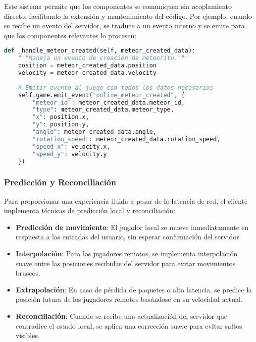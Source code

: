 \documentclass[12pt,letterpaper]{article}
\begin{document}
Este sistema permite que los componentes se comuniquen sin acoplamiento directo, facilitando la extensión y mantenimiento del código. Por ejemplo, cuando se recibe un evento del servidor, se traduce a un evento interno y se emite para que los componentes relevantes lo procesen:

\begin{lstlisting}[language=python, caption=Ejemplo de traducción de eventos de red a eventos del juego]
def _handle_meteor_created(self, meteor_created_data):
    """Maneja un evento de creación de meteorito."""
    position = meteor_created_data.position
    velocity = meteor_created_data.velocity
    
    # Emitir evento al juego con todos los datos necesarios
    self.game.emit_event("online_meteor_created", {
        "meteor_id": meteor_created_data.meteor_id,
        "type": meteor_created_data.meteor_type,
        "x": position.x,
        "y": position.y,
        "angle": meteor_created_data.angle,
        "rotation_speed": meteor_created_data.rotation_speed,
        "speed_x": velocity.x,
        "speed_y": velocity.y
    })
\end{lstlisting}

\subsubsection{Predicción y Reconciliación}

Para proporcionar una experiencia fluida a pesar de la latencia de red, el cliente implementa técnicas de predicción local y reconciliación:

\begin{itemize}
    \item \textbf{Predicción de movimiento}: El jugador local se mueve inmediatamente en respuesta a las entradas del usuario, sin esperar confirmación del servidor.
    
    \item \textbf{Interpolación}: Para los jugadores remotos, se implementa interpolación suave entre las posiciones recibidas del servidor para evitar movimientos bruscos.
    
    \item \textbf{Extrapolación}: En caso de pérdida de paquetes o alta latencia, se predice la posición futura de los jugadores remotos basándose en su velocidad actual.
    
    \item \textbf{Reconciliación}: Cuando se recibe una actualización del servidor que contradice el estado local, se aplica una corrección suave para evitar saltos visibles.
\end{itemize}
\end{document}
